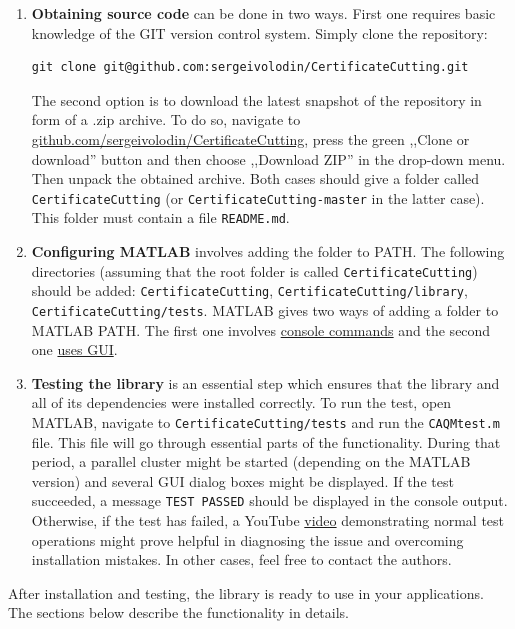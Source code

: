 \documentclass[a4paper]{article}
\theoremstyle{definition}
\begin{document}
\begin{enumerate}
\item {\bf Obtaining source code} can be done in two ways. First one requires basic knowledge of the GIT version control system. Simply clone the repository:
\begin{verbatim}
git clone git@github.com:sergeivolodin/CertificateCutting.git
\end{verbatim}
The second option is to download the latest snapshot of the repository in form of a .zip archive. To do so, navigate to \href{https://github.com/sergeivolodin/CertificateCutting}{github.com/sergeivolodin/CertificateCutting}, press the green ,,Clone or download'' button and then choose ,,Download ZIP'' in the drop-down menu. Then unpack the obtained archive. Both cases should give a folder called {\tt CertificateCutting} (or {\tt CertificateCutting-master} in the latter case). This folder must contain a file {\tt README.md}.
\item {\bf Configuring MATLAB} involves adding the folder to PATH. The following directories (assuming that the root folder is called {\tt CertificateCutting}) should be added: {\tt CertificateCutting}, {\tt CertificateCutting/library}, {\tt CertificateCutting/tests}. MATLAB gives two ways of adding a folder to MATLAB PATH. The first one involves \href{https://www.mathworks.com/help/matlab/ref/addpath.html}{console commands} and the second one \href{http://www.mathworks.com/help/matlab/ref/pathtool.html}{uses GUI}.
\item {\bf Testing the library} is an essential step which ensures that the library and all of its dependencies were installed correctly. To run the test, open MATLAB, navigate to {\tt CertificateCutting/tests} and run the {\tt CAQMtest.m} file. This file will go through essential parts of the functionality. During that period, a parallel cluster might be started (depending on the MATLAB version) and several GUI dialog boxes might be displayed. If the test succeeded, a message {\tt TEST PASSED} should be displayed in the console output. Otherwise, if the test has failed, a YouTube \href{https://youtu.be/Ikh_GDHnu-4}{video} demonstrating normal test operations might prove helpful in diagnosing the issue and overcoming installation mistakes. In other cases, feel free to contact the authors.
\end{enumerate}

After installation and testing, the library is ready to use in your applications. The sections below describe the functionality in details.
\end{document}
